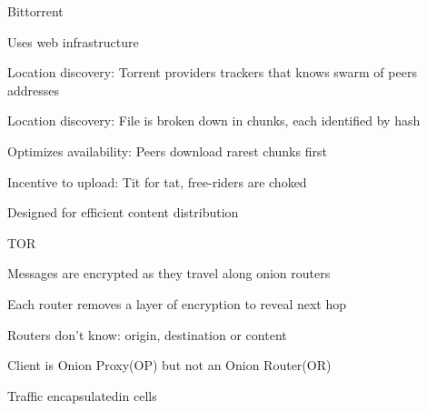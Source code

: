 \documentclass[main.tex]{subfiles}
\begin{document}
\begin{card}{Bittorrent}
\item Uses web infrastructure
\item Location discovery: Torrent providers trackers that knows swarm of peers addresses
\item Location discovery: File is broken down in chunks, each identified by hash
\item Optimizes availability: Peers download rarest chunks first
\item Incentive to upload: Tit for tat, free-riders are choked
\item Designed for efficient content distribution
\end{card}


\begin{card}{TOR}
\item Messages are encrypted as they travel along onion routers
\item Each router removes a layer of encryption to reveal next hop
\item Routers don't know: origin, destination or content
\item Client is Onion Proxy(OP) but not an Onion Router(OR)
\item Traffic encapsulatedin cells
\end{card}
\end{document}
